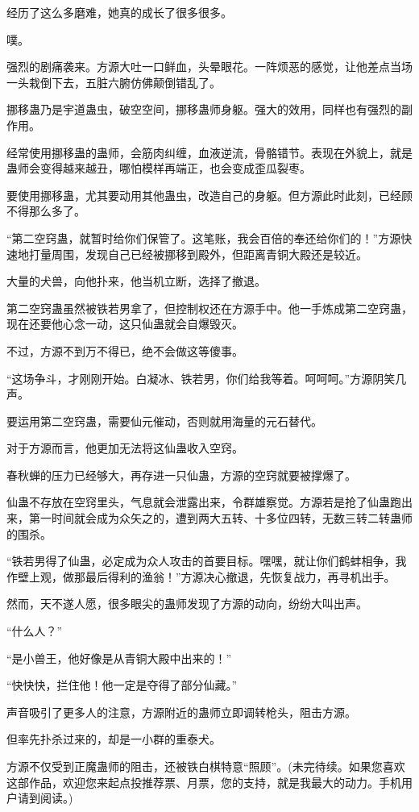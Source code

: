 \begin{this_body}
经历了这么多磨难，她真的成长了很多很多。

噗。

强烈的剧痛袭来。方源大吐一口鲜血，头晕眼花。一阵烦恶的感觉，让他差点当场一头栽倒下去，五脏六腑仿佛颠倒错乱了。

挪移蛊乃是宇道蛊虫，破空空间，挪移蛊师身躯。强大的效用，同样也有强烈的副作用。

经常使用挪移蛊的蛊师，会筋肉纠缠，血液逆流，骨骼错节。表现在外貌上，就是蛊师会变得越来越丑，哪怕模样再端正，也会变成歪瓜裂枣。

要使用挪移蛊，尤其要动用其他蛊虫，改造自己的身躯。但方源此时此刻，已经顾不得那么多了。

“第二空窍蛊，就暂时给你们保管了。这笔账，我会百倍的奉还给你们的！”方源快速地打量周围，发现自己已经被挪移到殿外，但距离青铜大殿还是较近。

大量的犬兽，向他扑来，他当机立断，选择了撤退。

第二空窍蛊虽然被铁若男拿了，但控制权还在方源手中。他一手炼成第二空窍蛊，现在还要他心念一动，这只仙蛊就会自爆毁灭。

不过，方源不到万不得已，绝不会做这等傻事。

“这场争斗，才刚刚开始。白凝冰、铁若男，你们给我等着。呵呵呵。”方源阴笑几声。

要运用第二空窍蛊，需要仙元催动，否则就用海量的元石替代。

对于方源而言，他更加无法将这仙蛊收入空窍。

春秋蝉的压力已经够大，再存进一只仙蛊，方源的空窍就要被撑爆了。

仙蛊不存放在空窍里头，气息就会泄露出来，令群雄察觉。方源若是抢了仙蛊跑出来，第一时间就会成为众矢之的，遭到两大五转、十多位四转，无数三转二转蛊师的围杀。

“铁若男得了仙蛊，必定成为众人攻击的首要目标。嘿嘿，就让你们鹤蚌相争，我作壁上观，做那最后得利的渔翁！”方源决心撤退，先恢复战力，再寻机出手。

然而，天不遂人愿，很多眼尖的蛊师发现了方源的动向，纷纷大叫出声。

“什么人？”

“是小兽王，他好像是从青铜大殿中出来的！”

“快快快，拦住他！他一定是夺得了部分仙藏。”

声音吸引了更多人的注意，方源附近的蛊师立即调转枪头，阻击方源。

但率先扑杀过来的，却是一小群的重泰犬。

方源不仅受到正魔蛊师的阻击，还被铁白棋特意“照顾”。(未完待续。如果您喜欢这部作品，欢迎您来起点投推荐票、月票，您的支持，就是我最大的动力。手机用户请到阅读。)

\end{this_body}


